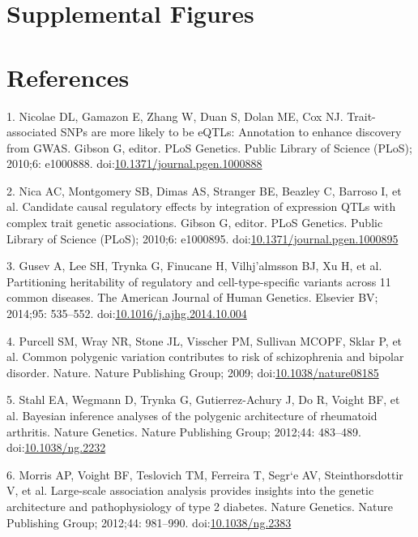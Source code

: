 \documentclass[]{article}
\begin{document}
\section{Supplemental Figures}\label{supplemental-figures}

\section*{References}\label{references}

1. Nicolae DL, Gamazon E, Zhang W, Duan S, Dolan ME, Cox NJ.
Trait-associated SNPs are more likely to be eQTLs: Annotation to enhance
discovery from GWAS. Gibson G, editor. PLoS Genetics. Public Library of
Science (PLoS); 2010;6: e1000888.
doi:\href{http://dx.doi.org/10.1371/journal.pgen.1000888}{10.1371/journal.pgen.1000888}

2. Nica AC, Montgomery SB, Dimas AS, Stranger BE, Beazley C, Barroso I,
et al. Candidate causal regulatory effects by integration of expression
QTLs with complex trait genetic associations. Gibson G, editor. PLoS
Genetics. Public Library of Science (PLoS); 2010;6: e1000895.
doi:\href{http://dx.doi.org/10.1371/journal.pgen.1000895}{10.1371/journal.pgen.1000895}

3. Gusev A, Lee SH, Trynka G, Finucane H, Vilhj{\a'a}lmsson BJ, Xu H, et
al. Partitioning heritability of regulatory and cell-type-specific
variants across 11 common diseases. The American Journal of Human
Genetics. Elsevier BV; 2014;95: 535--552.
doi:\href{http://dx.doi.org/10.1016/j.ajhg.2014.10.004}{10.1016/j.ajhg.2014.10.004}

4. Purcell SM, Wray NR, Stone JL, Visscher PM, Sullivan MCOPF, Sklar P,
et al. Common polygenic variation contributes to risk of schizophrenia
and bipolar disorder. Nature. Nature Publishing Group; 2009;
doi:\href{http://dx.doi.org/10.1038/nature08185}{10.1038/nature08185}

5. Stahl EA, Wegmann D, Trynka G, Gutierrez-Achury J, Do R, Voight BF,
et al. Bayesian inference analyses of the polygenic architecture of
rheumatoid arthritis. Nature Genetics. Nature Publishing Group; 2012;44:
483--489. doi:\href{http://dx.doi.org/10.1038/ng.2232}{10.1038/ng.2232}

6. Morris AP, Voight BF, Teslovich TM, Ferreira T, Segr{\a`e} AV,
Steinthorsdottir V, et al. Large-scale association analysis provides
insights into the genetic architecture and pathophysiology of type 2
diabetes. Nature Genetics. Nature Publishing Group; 2012;44: 981--990.
doi:\href{http://dx.doi.org/10.1038/ng.2383}{10.1038/ng.2383}
\end{document}
